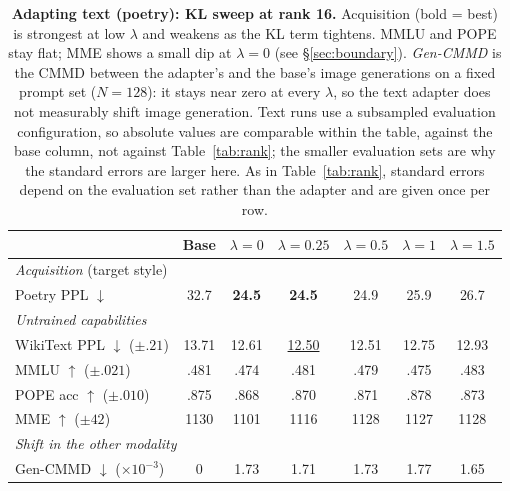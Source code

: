 \documentclass{article}
\begin{document}
\begin{table}[t]
\caption{\textbf{Adapting text (poetry): KL sweep at rank 16.} Acquisition (bold
= best) is strongest at low $\lambda$ and weakens as the KL term tightens. MMLU
and POPE stay flat; MME shows a small dip at $\lambda=0$ (see
\S\ref{sec:boundary}). \emph{Gen-CMMD} is the CMMD between the adapter's and the
base's image generations on a fixed prompt set ($N{=}128$): it stays near zero at
every $\lambda$, so the text adapter does not measurably shift image generation.
Text runs use a subsampled evaluation configuration, so absolute values are
comparable within the table, against the base column, not against
Table~\ref{tab:rank}; the smaller evaluation sets are why the standard errors are
larger here. As in Table~\ref{tab:rank}, standard errors depend on the evaluation
set rather than the adapter and are given once per row.}
\label{tab:textkl}
\centering\small
\begin{tabular}{lcccccc}
\toprule
& Base & $\lambda{=}0$ & $\lambda{=}0.25$ & $\lambda{=}0.5$ & $\lambda{=}1$ & $\lambda{=}1.5$ \\
\midrule
\multicolumn{7}{l}{\emph{Acquisition} (target style)}\\
Poetry PPL $\downarrow$ & 32.7 & \textbf{24.5} & \textbf{24.5} & 24.9 & 25.9 & 26.7 \\
\midrule
\multicolumn{7}{l}{\emph{Untrained capabilities}}\\
WikiText PPL $\downarrow$ \tiny($\pm.21$) & 13.71 & 12.61 & \underline{12.50} & 12.51 & 12.75 & 12.93 \\
MMLU $\uparrow$ \tiny($\pm.021$)          & .481 & .474 & .481 & .479 & .475 & .483 \\
POPE acc $\uparrow$ \tiny($\pm.010$)      & .875 & .868 & .870 & .871 & .878 & .873 \\
MME $\uparrow$ \tiny($\pm42$)             & 1130 & 1101 & 1116 & 1128 & 1127 & 1128 \\
\midrule
\multicolumn{7}{l}{\emph{Shift in the other modality}}\\
Gen-CMMD $\downarrow$ ($\times10^{-3}$) & 0 & 1.73 & 1.71 & 1.73 & 1.77 & 1.65 \\
\bottomrule
\end{tabular}
\end{table}
\end{document}
